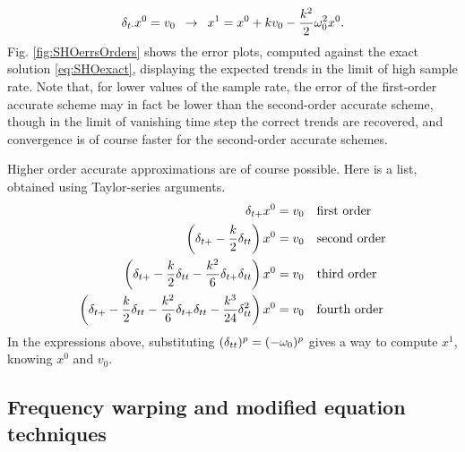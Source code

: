 \begin{equation}
    \delta_{t\cdot} x^0 = v_0 \,\,\, \rightarrow \,\,\, x^1 = x^0 + kv_0 - \frac{k^2}{2}\omega_0^2x^0.
\end{equation}
Fig. \ref{fig:SHOerrsOrders} shows the error plots, computed against the exact solution \eqref{eq:SHOexact}, displaying the expected  trends in the limit of high sample rate. Note that, for lower values of the sample rate, the error of the first-order accurate scheme may in fact be lower than the second-order accurate scheme, though in the limit of vanishing time step the correct trends are recovered, and convergence is of course faster for the second-order accurate schemes.  

Higher order accurate approximations are of course possible. Here is a list, obtained using Taylor-series arguments. 
\begin{align}\label{eq:HigherOrderICsOscillator}
\delta_{t+} x^0 &= v_0 \quad \text{first order}\\
\left(\delta_{t+} -\frac{k}{2}\delta_{tt} \right) x^0 &= v_0 \quad \text{second order}\\
\left(\delta_{t+} -\frac{k}{2}\delta_{tt} - \frac{k^2}{6}\delta_{t+} \delta_{tt} \right) x^0 &= v_0 \quad \text{third order}\\
\left(\delta_{t+} -\frac{k}{2}\delta_{tt} - \frac{k^2}{6}\delta_{t+} \delta_{tt} - \frac{k^3}{24}\delta_{tt}^2 \right) x^0 &= v_0 \quad \text{fourth order}
\end{align}
In the expressions above, substituting $(\delta_{tt})^p = (-\omega_0)^p$ gives a way to compute $x^1$, knowing $x^0$ and $v_0$. 


\subsection{Frequency warping and modified equation techniques}\label{eq:ModEqTechniques}

